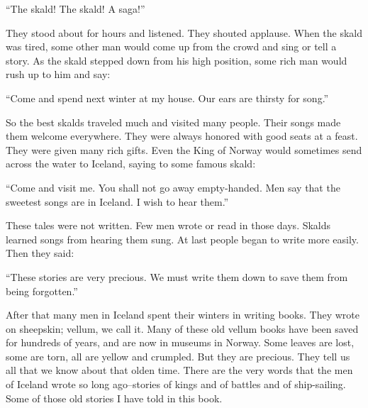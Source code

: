 ``The skald! The skald! A saga!''

They stood about for hours and listened. They shouted applause. When the
skald was tired, some other man would come up from the crowd and sing or
tell a story. As the skald stepped down from his high position, some
rich man would rush up to him and say:

``Come and spend next winter at my house. Our ears are thirsty for
song.''

So the best skalds traveled much and visited many people. Their songs
made them welcome everywhere. They were always honored with good seats
at a feast. They were given many rich gifts. Even the King of Norway
would sometimes send across the water to Iceland, saying to some famous
skald:

``Come and visit me. You shall not go away empty-handed. Men say that
the sweetest songs are in Iceland. I wish to hear them.''

These tales were not written. Few men wrote or read in those days.
Skalds learned songs from hearing them sung. At last people began to
write more easily. Then they said:

``These stories are very precious. We must write them down to save them
from being forgotten.''

After that many men in Iceland spent their winters in writing books.
They wrote on sheepskin; vellum, we call it. Many of these old vellum
books have been saved for hundreds of years, and are now in museums in
Norway. Some leaves are lost, some are torn, all are yellow and
crumpled. But they are precious. They tell us all that we know about
that olden time. There are the very words that the men of Iceland wrote
so long ago--stories of kings and of battles and of ship-sailing. Some
of those old stories I have told in this book.
